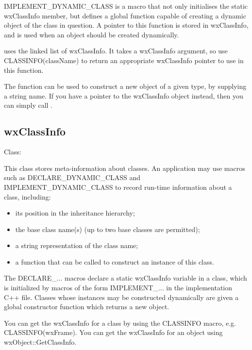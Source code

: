 IMPLEMENT\_DYNAMIC\_CLASS is a macro that not only initialises the static
wxClassInfo member, but defines a global function capable of creating a
dynamic object of the class in question. A pointer to this function is
stored in wxClassInfo, and is used when an object should be created
dynamically.

 uses the linked list of
wxClassInfo. It takes a wxClassInfo argument, so use CLASSINFO(className)
to return an appropriate wxClassInfo pointer to use in this function.

The function  can be used
to construct a new object of a given type, by supplying a string name.
If you have a pointer to the wxClassInfo object instead, then you
can simply call .

\subsection{wxClassInfo}\label{wxclassinfooverview}


Class: 

This class stores meta-information about classes. An application
may use macros such as DECLARE\_DYNAMIC\_CLASS and IMPLEMENT\_DYNAMIC\_CLASS
to record run-time information about a class, including:

\begin{itemize}\itemsep=0pt
\item its position in the inheritance hierarchy;
\item the base class name(s) (up to two base classes are permitted);
\item a string representation of the class name;
\item a function that can be called to construct an instance of this class.
\end{itemize}

The DECLARE\_... macros declare a static wxClassInfo variable in a class, which is initialized
by macros of the form IMPLEMENT\_... in the implementation C++ file. Classes whose instances may be
constructed dynamically are given a global constructor function which returns a new object.

You can get the wxClassInfo for a class by using the CLASSINFO macro, e.g. CLASSINFO(wxFrame).
You can get the wxClassInfo for an object using wxObject::GetClassInfo.

